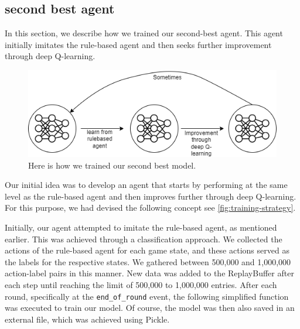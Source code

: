 \subsection{second best agent}

In this section, we describe how we trained our second-best agent. This agent initially imitates 
the rule-based agent and then seeks further improvement through deep Q-learning.

\begin{figure}[H]
    \centering
    
    \includegraphics[width=\oneImgWidth]{images/training-strategy}%
    
    \captionadjust%
    \caption{\label{fig:training-strategy} Here is how we trained our second best model.
    }%
\end{figure}

Our initial idea was to develop an agent that starts by performing at the same level as the rule-based agent and then improves 
further through deep Q-learning. For this purpose, we had devised the following concept see \autoref{fig:training-strategy}.

Initially, our agent attempted to imitate the rule-based agent, as mentioned earlier. This was achieved through a classification approach. 
We collected the actions of the rule-based agent for each game state, and these actions served as the labels for the respective states. 
We gathered between 500,000 and 1,000,000 action-label pairs in this manner.
New data was added to the ReplayBuffer after each step until reaching the limit of 500,000 to 1,000,000 entries. 
After each round, specifically at the \verb|end_of_round| event, the following simplified function was executed to train our model.
Of course, the model was then also saved in an external file, which was achieved using Pickle.

